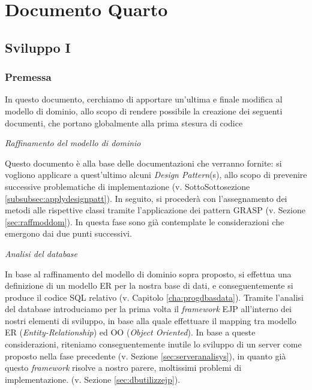 \part{Documento Quarto}\label{part:docQuar}
\chapter{Sviluppo I}\label{cha:pds}
\minitoc\mtcskip
\section{Premessa}
In questo documento, cerchiamo di apportare un'ultima e finale modifica al 
modello di dominio, allo scopo di rendere possibile la creazione dei seguenti
documenti, che portano globalmente alla prima stesura di codice

\begin{itemize}
\diam \textit{Raffinamento del modello di dominio}

Questo documento è alla base delle documentazioni che verranno fornite: si vogliono
applicare a quest'ultimo alcuni \textit{Design Pattern}(s), allo scopo di prevenire
successive problematiche di implementazione (v. SottoSottosezione 
\vref{subsubsec:applydesignpatt}).
In seguito, si procederà con l'assegnamento dei metodi alle rispettive classi
tramite l'applicazione dei pattern GRASP (v. Sezione \vref{sec:raffmoddom}).
In questa fase sono già contemplate le considerazioni che emergono dai due punti
successivi.
\medskip

\diam \textit{Analisi del database}

In base al raffinamento del modello di dominio sopra proposto, si effettua
una definizione di un modello ER per la nostra base di dati, e conseguentemente
si produce il codice SQL relativo (v. Capitolo \vref{cha:progdbasdata}).
Tramite l'analisi del database introduciamo per la
prima volta il \textit{framework} EJP all'interno dei nostri elementi di sviluppo,
in base alla quale effettuare il mapping tra modello ER (\textit{Entity-Relationship}) 
ed OO (\textit{Object Oriented}). In base a queste considerazioni, riteniamo
conseguentemente inutile lo sviluppo di un server come proposto nella fase
precedente (v. Sezione \vref{sec:serveranalisys}), in quanto già questo \textit{framework }
risolve a nostro parere, moltissimi problemi di implementazione.
(v. Sezione \vref{sec:dbutilizzejp}).
\medskip



\medskip
\end{itemize}
